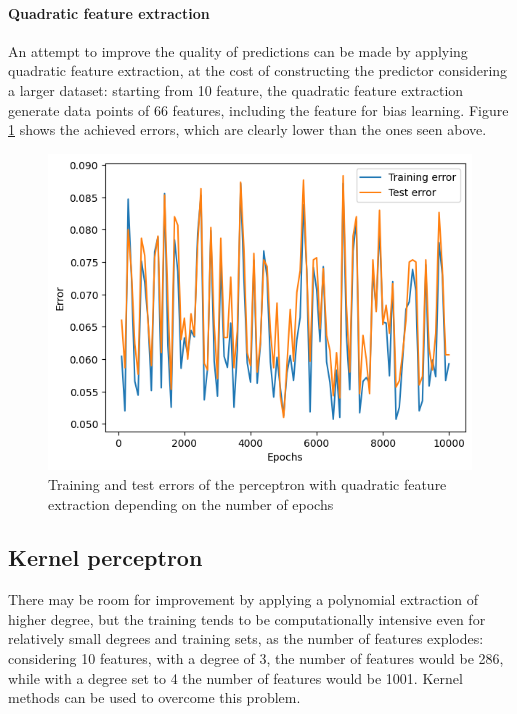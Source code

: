 \documentclass{article}
\begin{document}
\paragraph{Quadratic feature extraction}
An attempt to improve the quality of predictions can be made by applying quadratic feature extraction, at the cost of constructing the predictor considering a larger dataset: starting from 10 feature, the quadratic feature extraction generate data points of 66 features, including the feature for bias learning. 
Figure \ref{fig:quad_perceptron} shows the achieved errors, which are clearly lower than the ones seen above.

\begin{figure}
	\centering
	\includegraphics[width=0.5\columnwidth]{../plots/quad_perceptron.png}
	\caption{Training and test errors of the perceptron with quadratic feature extraction depending on the number of epochs}
	\label{fig:quad_perceptron}
\end{figure}

\subsection{Kernel perceptron}
There may be room for improvement by applying a polynomial extraction of higher degree, but the training tends to be computationally intensive even for relatively small degrees and training sets, as the number of features explodes: considering 10 features, with a degree of 3, the number of features would be 286, while with a degree set to 4 the number of features would be 1001. Kernel methods can be used to overcome this problem. 
\end{document}
